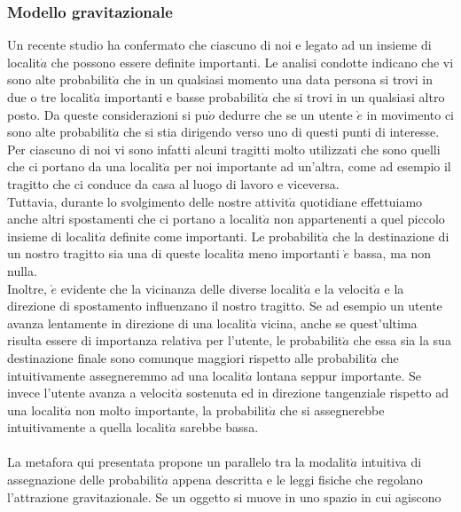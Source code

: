 \subsubsection{Modello gravitazionale}
Un recente studio \cite{cit_44} ha confermato che ciascuno di noi e legato ad un
insieme di localit$\grave{a}$ che possono essere definite importanti. Le analisi condotte
indicano che vi sono alte probabilit$\grave{a}$ che in un qualsiasi momento una data
persona si trovi in due o tre localit$\grave{a}$ importanti e basse probabilit$\grave{a}$ che si trovi
in un qualsiasi altro posto. Da queste considerazioni si pu$\grave{o}$ dedurre che se un
utente $\grave{e}$ in movimento ci sono alte probabilit$\grave{a}$ che si stia dirigendo verso uno
di questi punti di interesse. Per ciascuno di noi vi sono infatti alcuni tragitti
molto utilizzati che sono quelli che ci portano da una localit$\grave{a}$ per noi importante
ad un'altra, come ad esempio il tragitto che ci conduce da casa al luogo
di lavoro e viceversa.\\
Tuttavia, durante lo svolgimento delle nostre attivit$\grave{a}$ quotidiane effettuiamo
anche altri spostamenti che ci portano a localit$\grave{a}$ non appartenenti a quel piccolo
insieme di localit$\grave{a}$ definite come importanti. Le probabilit$\grave{a}$ che la destinazione
di un nostro tragitto sia una di queste localit$\grave{a}$ meno importanti $\grave{e}$ bassa, ma
non nulla.\\
Inoltre, $\grave{e}$ evidente che la vicinanza delle diverse localit$\grave{a}$ e la velocit$\grave{a}$ e la direzione
di spostamento influenzano il nostro tragitto. Se ad esempio un utente
avanza lentamente in direzione di una localit$\grave{a}$ vicina, anche se quest'ultima
risulta essere di importanza relativa per l'utente, le probabilit$\grave{a}$ che essa sia la
sua destinazione finale sono comunque maggiori rispetto alle probabilit$\grave{a}$ che
intuitivamente assegneremmo ad una localit$\grave{a}$ lontana seppur importante. Se
invece l'utente avanza a velocit$\grave{a}$ sostenuta ed in direzione tangenziale rispetto
ad una localit$\grave{a}$ non molto importante, la probabilit$\grave{a}$ che si assegnerebbe
intuitivamente a quella localit$\grave{a}$ sarebbe bassa.\\
\\
La metafora qui presentata propone un parallelo tra la modalit$\grave{a}$ intuitiva
di assegnazione delle probabilit$\grave{a}$ appena descritta e le leggi fisiche che regolano
l'attrazione gravitazionale. Se un oggetto si muove in uno spazio in cui agiscono
